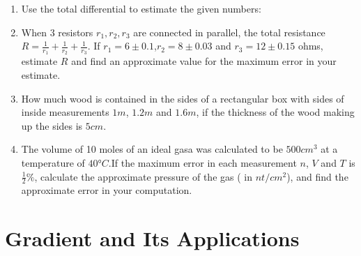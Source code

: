 \documentclass[journal,12pt,twocolumn]{IEEEtran}
\begin{document}
\begin{enumerate}
\begin{enumerate}[(a)]
\end{enumerate}

\item Use the total differential to estimate the given numbers:

\begin{enumerate}[(i)]
\end{enumerate}

\item When 3 resistors $r_1,r_2,r_3$ are connected in parallel, the total resistance $R = \frac{1}{r_1}+\frac{1}{r_2}+\frac{1}{r_3}$. If $r_1 =6 \pm 0.1$,$r_2=8 \pm 0.03$ and $r_3=12 \pm 0.15$ ohms, estimate $R$ and find an approximate value for the maximum error in your estimate.

\item How much wood is contained in the sides of a rectangular box with sides of inside measurements
$1m$, $1.2m$ and $1.6m$, if the thickness of the wood making up the sides is $5cm$.

\item The volume of 10 moles of an ideal gasa was calculated to be $500cm^3$ at a temperature of $ \ang{40} C$.If the maximum error in each measurement $n$, $V$ and $T$ is $\frac{1}{2} \% $, calculate the approximate pressure of the gas ( in $nt/cm^2$), and find the approximate error in your computation.

\end{enumerate}


\section{Gradient and Its Applications}
\end{document}
